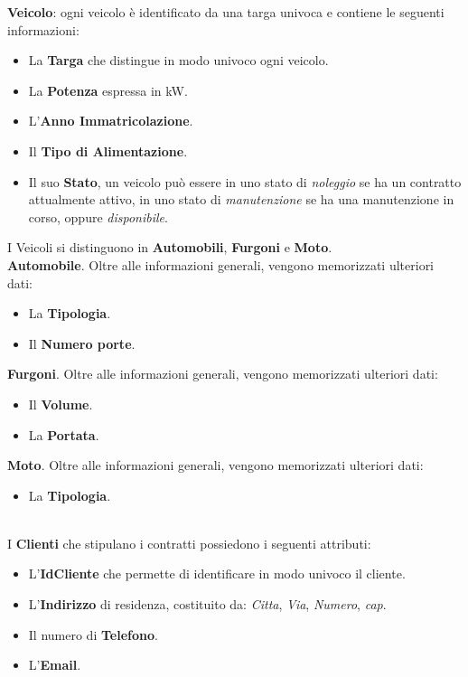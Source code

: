 \documentclass[10pt,a4paper]{article}
\begin{document}
\noindent
\textbf{Veicolo}: ogni veicolo è identificato da una targa univoca e contiene le seguenti informazioni: 
\begin{itemize}
    \item La \textbf{Targa} che distingue in modo univoco ogni veicolo.
    \item La \textbf{Potenza} espressa in kW.
    \item  L'\textbf{Anno Immatricolazione}.
    \item Il \textbf{Tipo di Alimentazione}.
    \item Il suo \textbf{Stato}, un veicolo può essere in uno stato di \textit{noleggio} se ha un contratto attualmente attivo, in uno stato di \textit{manutenzione} se ha una manutenzione in corso, oppure \textit{disponibile}.
\end{itemize}
\noindent
I Veicoli si distinguono in \textbf{Automobili}, \textbf{Furgoni} e \textbf{Moto}.\\
\textbf{Automobile}. Oltre alle informazioni generali, vengono memorizzati ulteriori dati:
\begin{itemize}
    \item La \textbf{Tipologia}.
    \item Il \textbf{Numero porte}.
\end{itemize}
\textbf{Furgoni}. Oltre alle informazioni generali, vengono memorizzati ulteriori dati:
\begin{itemize}
    \item Il \textbf{Volume}.
    \item La \textbf{Portata}.
\end{itemize}
\textbf{Moto}. Oltre alle informazioni generali, vengono memorizzati ulteriori dati:
\begin{itemize}
    \item La \textbf{Tipologia}.
\end{itemize}
\\
\noindent
I \textbf{Clienti} che stipulano i contratti possiedono i seguenti attributi:
\begin{itemize}
    \item L'\textbf{IdCliente} che permette di identificare in modo univoco il cliente.
    \item L'\textbf{Indirizzo} di residenza, costituito da: \textit{Citta}, \textit{Via}, \textit{Numero}, \textit{cap}.
    \item  Il numero di \textbf{Telefono}.
    \item L'\textbf{Email}.\\
\end{itemize}
\end{document}
